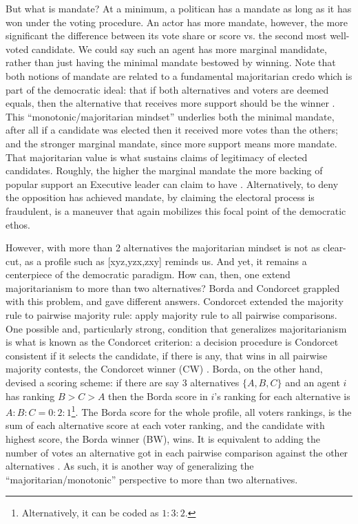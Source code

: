 \documentclass[hidelinks,11pt]{article}
\begin{document}
But what is mandate? At a minimum, a politican has a mandate as long as it has
won under the voting procedure. An actor has more mandate, however, the more
significant the difference between its vote share or score vs. the second most
well-voted candidate. We could say such an agent has more marginal mandidate,
rather than just having the minimal mandate bestowed by winning. Note that both
notions of mandate are related to a fundamental majoritarian credo which is part
of the democratic ideal: that if both alternatives and voters are deemed equals,
then the alternative that receives more support should be the winner
\parencite{dahl1989democracy}. This ``monotonic/majoritarian mindset'' underlies
both the minimal mandate, after all if a candidate was elected then it received
more votes than the others; and the stronger marginal mandate, since more
support means more mandate. That majoritarian value is what sustains claims of
legitimacy of elected candidates. Roughly, the higher the marginal mandate the
more backing of popular support an Executive leader can claim to have
\parencite{grossman2022majoritarian}. Alternatively, to deny the opposition has
achieved mandate, by claiming the electoral process is fraudulent, is a maneuver
that again mobilizes this focal point of the democratic ethos.

However, with more than 2 alternatives the majoritarian mindset is not as
clear-cut, as a profile such as [xyz,yzx,zxy] reminds us. And yet, it remains a
centerpiece of the democratic paradigm. How can, then, one extend
majoritarianism to more than two alternatives? Borda and Condorcet grappled with
this problem, and gave different answers. Condorcet extended the majority rule
to pairwise majority rule: apply majority rule to all pairwise comparisons. One
possible and, particularly strong, condition that generalizes majoritarianism is
what is known as the Condorcet criterion: a decision procedure is Condorcet
consistent if it selects the candidate, if there is any, that wins in all
pairwise majority contests, the Condorcet winner (CW)
\parencite{felsenthal2011review}. Borda, on the other hand, devised a scoring
scheme: if there are say 3 alternatives \(\{A,B,C\}\) and an agent \(i\) has
ranking \(B>C>A\) then the Borda score in \(i\)'s ranking for each alternative
is \(A:B:C = 0:2:1\)\footnote{Alternatively, it can be coded as \(1:3:2\).}. The
Borda score for the whole profile, all voters rankings, is the sum of each
alternative score at each voter ranking, and the candidate with highest score,
the Borda winner (BW), wins. It is equivalent to adding the number of votes an
alternative got in each pairwise comparison against the other alternatives
\parencite{nurmi1999voting}. As such, it is another way of generalizing the
``majoritarian/monotonic'' perspective to more than two alternatives.
\end{document}

